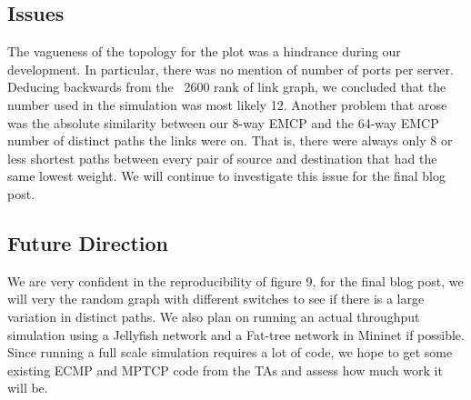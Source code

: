 \documentclass[letter paper, 11pt]{article}
\begin{document}
\subsection*{Issues}


The vagueness of the topology for the plot was a hindrance during our development. In particular, there was no mention of number of ports per server. Deducing backwards from the ~2600 rank of link graph, we concluded that the number used in the simulation was most likely 12. Another problem that arose was the absolute similarity between our 8-way EMCP and the 64-way EMCP number of distinct paths the links were on. That is, there were always only 8 or less shortest paths between
every pair of source and destination that had the same lowest weight. We will continue to investigate this issue for the final blog post.

\subsection*{Future Direction}
We are very confident in the reproducibility of figure 9, for the final blog post, we will very the random graph with different switches to see if there is a large variation in distinct paths. We also plan on running an actual throughput simulation using a Jellyfish network and a Fat-tree network in Mininet if possible. Since running a full scale simulation requires a lot of code, we hope to get some existing ECMP and MPTCP code from the TAs and assess how much work it will
be.
\end{document}
